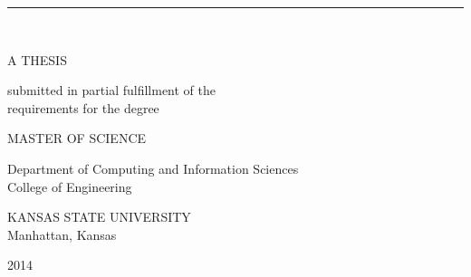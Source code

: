 \begin{center}
   \vspace{0.35cm}
   \rule{2in}{0.5pt}\\
   \vspace{0.65cm}

   {\large A THESIS}\\

   \vspace{0.3cm}
   \begin{singlespace}
   submitted in partial fulfillment of the\\
   requirements for the degree\\
   \end{singlespace}

   \vspace{0.3cm}


   {\large MASTER OF SCIENCE}\\
   \vspace{0.3cm}


   \begin{singlespace}
   Department of Computing and Information Sciences\\
   College of Engineering\\
   \end{singlespace}

   \vspace{0.3cm}

   \begin{singlespace}
   {\large KANSAS STATE UNIVERSITY}\\
   Manhattan, Kansas\\
   \end{singlespace}


   2014\\
   \vspace{0.3cm}

    \end{center}

